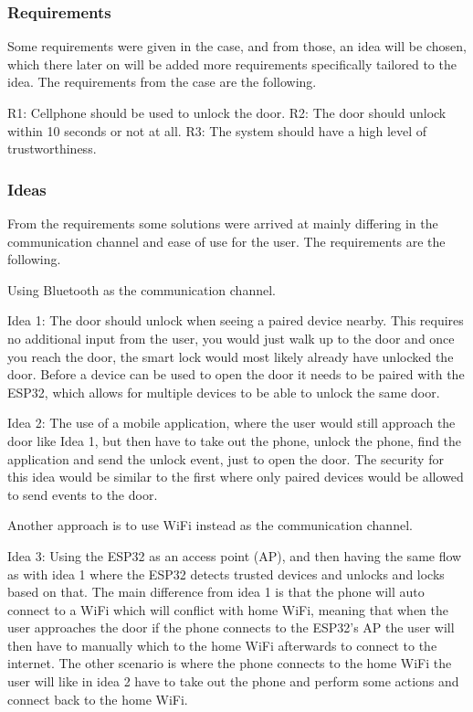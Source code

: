 \subsubsection{Requirements}
Some requirements were given in the case, and from those, an idea will be chosen, which there later on will be added more requirements specifically tailored to the idea. The requirements from the case are the following.

R1: Cellphone should be used to unlock the door.
R2: The door should unlock within 10 seconds or not at all.
R3: The system should have a high level of trustworthiness.

\subsubsection{Ideas}
From the requirements some solutions were arrived at mainly differing in the communication channel and ease of use for the user. The requirements are the following.

Using Bluetooth as the communication channel.

Idea 1: The door should unlock when seeing a paired device nearby. This requires no additional input from the user, you would just walk up to the door and once you reach the door, the smart lock would most likely already have unlocked the door. Before a device can be used to open the door it needs to be paired with the ESP32, which allows for multiple devices to be able to unlock the same door.

Idea 2: The use of a mobile application, where the user would still approach the door like Idea 1, but then have to take out the phone, unlock the phone, find the application and send the unlock event, just to open the door. The security for this idea would be similar to the first where only paired devices would be allowed to send events to the door.

Another approach is to use WiFi instead as the communication channel.

Idea 3: Using the ESP32 as an access point (AP), and then having the same flow as with idea 1 where the ESP32 detects trusted devices and unlocks and locks based on that. The main difference from idea 1 is that the phone will auto connect to a WiFi which will conflict with home WiFi, meaning that when the user approaches the door if the phone connects to the ESP32’s AP the user will then have to manually which to the home WiFi afterwards to connect to the internet. The other scenario is where the phone connects to the home WiFi the user will like in idea 2 have to take out the phone and perform some actions and connect back to the home WiFi.

